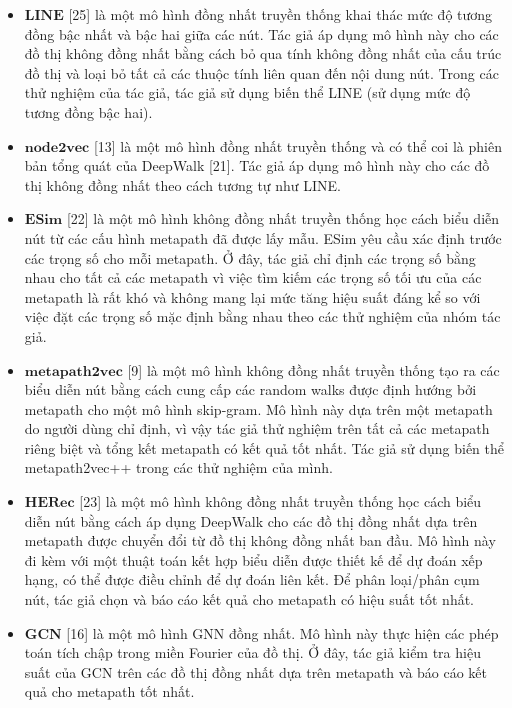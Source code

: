\begin{table}[]
\begin{tabular}{|l|l|l|l|}
  \end{tabular}
  \end{table}

\begin{itemize}
  \item $\mathbf{LINE}$ [25] là một mô hình đồng nhất truyền thống khai thác mức độ tương đồng bậc nhất và bậc hai giữa các nút. Tác giả áp dụng mô hình này cho các đồ thị không đồng nhất bằng cách bỏ qua tính không đồng nhất của cấu trúc đồ thị và loại bỏ tất cả các thuộc tính liên quan đến nội dung nút. Trong các thử nghiệm của tác giả, tác giả sử dụng biến thể LINE (sử dụng mức độ tương đồng bậc hai).
  \item $\mathbf{node2vec}$ [13] là một mô hình đồng nhất truyền thống và có thể coi là phiên bản tổng quát của DeepWalk [21]. Tác giả áp dụng mô hình này cho các đồ thị không đồng nhất theo cách tương tự như LINE.
  \item $\mathbf{ESim}$ [22] là một mô hình không đồng nhất truyền thống học cách biểu diễn nút từ các cấu hình metapath đã được lấy mẫu. ESim yêu cầu xác định trước các trọng số cho mỗi metapath. Ở đây, tác giả chỉ định các trọng số bằng nhau cho tất cả các metapath vì việc tìm kiếm các trọng số tối ưu của các metapath là rất khó và không mang lại mức tăng hiệu suất đáng kể so với việc đặt các trọng số mặc định bằng nhau theo các thử nghiệm của nhóm tác giả.
  \item $\mathbf{metapath2vec}$ [9] là một mô hình không đồng nhất truyền thống tạo ra các biểu diễn nút bằng cách cung cấp các random walks được định hướng bởi metapath cho một mô hình skip-gram. Mô hình này dựa trên một metapath do người dùng chỉ định, vì vậy tác giả thử nghiệm trên tất cả các metapath riêng biệt và tổng kết metapath có kết quả tốt nhất. Tác giả sử dụng biến thể metapath2vec++ trong các thử nghiệm của mình. 
  \item $\mathbf{HERec}$ [23] là một mô hình không đồng nhất truyền thống học cách biểu diễn nút bằng cách áp dụng DeepWalk cho các đồ thị đồng nhất dựa trên metapath được chuyển đổi từ đồ thị không đồng nhất ban đầu. Mô hình này đi kèm với một thuật toán kết hợp biểu diễn được thiết kế để dự đoán xếp hạng, có thể được điều chỉnh để dự đoán liên kết. Để phân loại/phân cụm nút, tác giả chọn và báo cáo kết quả cho metapath có hiệu suất tốt nhất.
  \item $\mathbf{GCN}$ [16] là một mô hình GNN đồng nhất. Mô hình này thực hiện các phép toán tích chập trong miền Fourier của đồ thị. Ở đây, tác giả kiểm tra hiệu suất của GCN trên các đồ thị đồng nhất dựa trên metapath và báo cáo kết quả cho metapath tốt nhất.

\end{itemize}
